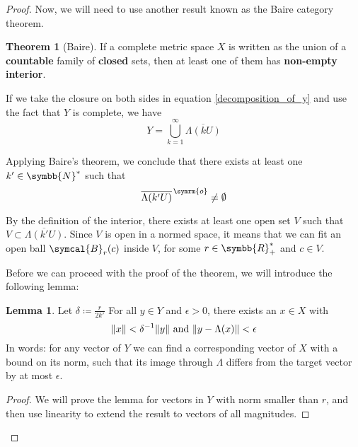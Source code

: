 \documentclass[a4paper, 12pt]{article}
\theoremstyle{definition}
\newtheorem*{theorem}{Theorem}
\newtheorem*{lemma}{Lemma}
\newcommand{\naturals}{\symbb{N}}
\newcommand{\reals}{\symbb{R}}
\newcommand{\ball}{\symcal{B}}
\DeclarePairedDelimiter{\norm}{\lVert}{\rVert}
\begin{document}
\begin{proof}
Now, we will need to use another result known as the Baire category theorem.
\begin{theorem}[Baire]
If a complete metric space \(X\) is written as the union of a \textbf{countable} family of \textbf{closed} sets, then at least one of them has \textbf{non-empty interior}.
\end{theorem}

If we take the closure on both sides in equation \ref{decomposition_of_y} and use the fact that \(Y\) is complete, we have
\[
    Y = \bigcup_{k=1}^{\infty} \overline{\Lambda(kU)}
\]

Applying Baire's theorem, we conclude that there exists at least one \(k' \in \naturals^*\) such that
\[
    \overline{\Lambda(k' U)}^{\, \symrm{o}} \neq \emptyset
\]

By the definition of the interior, there exists at least one open set \(V\) such that \(V \subset \overline{\Lambda(k'U)}\). Since \(V\) is open in a normed space, it means that we can fit an open ball \(\ball_r (c)\) inside \(V\), for some \(r \in \reals^*_+\) and \(c \in V\).

\begin{figure}[!ht]
    \centering
\end{figure}

Before we can proceed with the proof of the theorem, we will introduce the following lemma:
\begin{lemma}
    Let \(\delta \coloneqq \frac{r}{2k'}\) For all \(y \in Y\) and \(\epsilon > 0\), there exists an \(x \in X\) with
    \begin{equation} \label{definition_of_x}
        \norm{x} < \delta^{-1} \norm{y}
        \text{ and }
        \norm{y - \Lambda(x)} < \epsilon
    \end{equation}
    In words: for any vector of \(Y\) we can find a corresponding vector of \(X\) with a bound on its norm, such that its image through \(\Lambda\) differs from the target vector by at most \(\epsilon\).
\end{lemma}
\begin{proof}
We will prove the lemma for vectors in \(Y\) with norm smaller than \(r\), and then use linearity to extend the result to vectors of all magnitudes.


\end{proof}
\end{proof}
\end{document}
